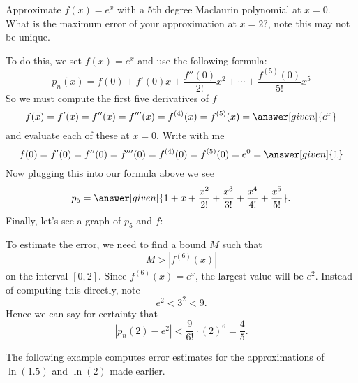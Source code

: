 \documentclass{ximera}
\begin{document}
\begin{example}
  Approximate $f(x) = e^x$ with a $5$th degree Maclaurin polynomial at
  $x = 0$.  What is the maximum error of your approximation at $x=2?$,
  note this may not be unique.
  \begin{explanation}
    To do this, we set $f(x) =e^x$ and use the following formula:
    \[
    p_n(x) = f(0) + f'(0)x +\frac{f''(0)}{2!}x^2+\cdots +\frac{f^{(5)}(0)}{5!}x^5
    \]
    So we must compute the first five derivatives of $f$
    \[
      f(x) = f'(x) = f''(x) = f'''(x) = f^{(4)}(x)  = f^{(5)}(x) = \answer[given]{e^x}
    \]
    and evaluate each of these at $x=0$. Write with me
    \[
    f(0) = f'(0) = f''(0) = f'''(0) = f^{(4)}(0)  = f^{(5)}(0) = e^0 = \answer[given]{1}
    \]
    Now plugging this into our formula above we see
    \[
    p_5 = \answer[given]{1 + x + \frac{x^2}{2!} + \frac{x^3}{3!} + \frac{x^4}{4!} + \frac{x^5}{5!}}.
    \]
    Finally, let's see a graph of $p_5$ and $f$:
      \begin{image}
      \end{image}
      To estimate the error, we need to find a bound $M$ such that
      \[
      M >|f^{(6)}(x)|
      \]
      on the interval $[0,2]$. Since $f^{(6)}(x) = e^x$, the largest
      value will be $e^2$. Instead of computing this directly, note
      \[
      e^2 < 3^2< 9.
      \]
      Hence we can say for certainty that
      \[
      |p_n(2) - e^2| < \frac{9}{6!}\cdot(2)^6 = \frac{4}{5}.
      \]
  \end{explanation}
\end{example}


The following example computes error estimates for the approximations
of $\ln(1.5)$ and $\ln(2)$ made earlier.
\end{document}
